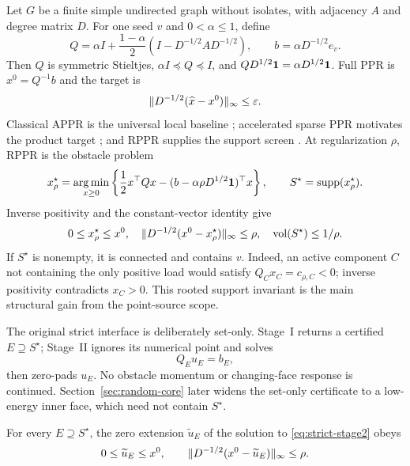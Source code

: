 Let $G$ be a finite simple undirected graph without isolates, with adjacency
$A$ and degree matrix $D$.  For one seed $v$ and $0<\alpha\leq1$, define
\begin{equation}
 Q=\alpha I+\frac{1-\alpha}{2}
   (I-D^{-1/2}AD^{-1/2}),
 \qquad b=\alpha D^{-1/2}e_v .
 \label{eq:strict-q}
\end{equation}
Then $Q$ is symmetric Stieltjes, $\alpha I\preceq Q\preceq I$, and
$QD^{1/2}\mathbf{1}=\alpha D^{1/2}\mathbf{1}$.  Full PPR is $x^0=Q^{-1}b$ and the target
is
\begin{equation}
 \lVert D^{-1/2}(\widehat x-x^0)\rVert_\infty\leq\varepsilon.
 \label{eq:strict-target}
\end{equation}
Classical APPR is the universal local baseline \citep{andersen2007using};
accelerated sparse PPR motivates the product target
\citep{martinezrubio2023accelerated,huang2025accelerated}; and RPPR supplies
the support screen \citep{fountoulakis2026complexity}.
At regularization $\rho$, RPPR is the obstacle problem
\begin{equation}
 x_\rho^\star=\operatorname*{arg\,min}_{x\geq0}
 \left\{\frac12x^\top Qx-(b-\alpha\rho D^{1/2}\mathbf{1})^\top x\right\},
 \qquad S^\star=\operatorname{supp}(x_\rho^\star).
 \label{eq:strict-rppr}
\end{equation}
Inverse positivity and the constant-vector identity give
\begin{equation}
 0\leq x_\rho^\star\leq x^0,
 \quad
 \lVert D^{-1/2}(x^0-x_\rho^\star)\rVert_\infty\leq\rho,
 \quad
 \operatorname{vol}(S^\star)\leq1/\rho.
 \label{eq:strict-bridge}
\end{equation}
If $S^\star$ is nonempty, it is connected and contains $v$.  Indeed, an
active component $C$ not containing the only positive load would satisfy
$Q_Cx_C=c_{\rho,C}<0$; inverse positivity contradicts $x_C>0$.  This rooted
support invariant is the main structural gain from the point-source scope.

The original strict interface is deliberately set-only.  Stage~I returns a
certified $E\supseteq S^\star$; Stage~II ignores its numerical point and solves
\begin{equation}
 Q_Eu_E=b_E,
 \label{eq:strict-stage2}
\end{equation}
then zero-pads $u_E$.  No obstacle momentum or changing-face response is
continued.
Section~\ref{sec:random-core} later widens the set-only certificate to a
low-energy inner face, which need not contain $S^\star$.

\begin{lemma}
\label{lem:strict-linearization}
For every $E\supseteq S^\star$, the zero extension $\widetilde u_E$ of the
solution to \cref{eq:strict-stage2} obeys
\begin{equation*}
 0\leq\widetilde u_E\leq x^0,
 \qquad
 \lVert D^{-1/2}(x^0-\widetilde u_E)\rVert_\infty\leq\rho.
\end{equation*}
\end{lemma}

